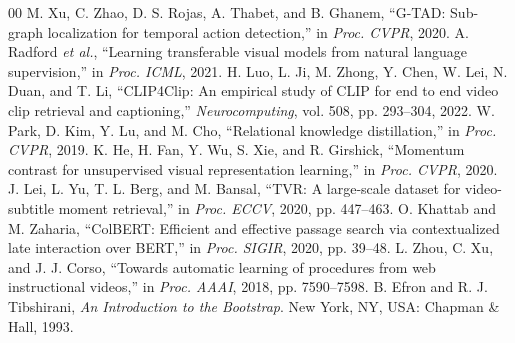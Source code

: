 \documentclass{IEEEtran}
\begin{document}
\begin{thebibliography}{00}
 M. Xu, C. Zhao, D. S. Rojas, A. Thabet, and B. Ghanem, ``G-TAD: Sub-graph localization for temporal action detection,'' in \textit{Proc. CVPR}, 2020.
 A. Radford \textit{et al.}, ``Learning transferable visual models from natural language supervision,'' in \textit{Proc. ICML}, 2021.
 H. Luo, L. Ji, M. Zhong, Y. Chen, W. Lei, N. Duan, and T. Li, ``CLIP4Clip: An empirical study of CLIP for end to end video clip retrieval and captioning,'' \textit{Neurocomputing}, vol. 508, pp. 293--304, 2022.
 W. Park, D. Kim, Y. Lu, and M. Cho, ``Relational knowledge distillation,'' in \textit{Proc. CVPR}, 2019.
 K. He, H. Fan, Y. Wu, S. Xie, and R. Girshick, ``Momentum contrast for unsupervised visual representation learning,'' in \textit{Proc. CVPR}, 2020.
 J. Lei, L. Yu, T. L. Berg, and M. Bansal, ``TVR: A large-scale dataset for video-subtitle moment retrieval,'' in \textit{Proc. ECCV}, 2020, pp. 447--463.
 O. Khattab and M. Zaharia, ``ColBERT: Efficient and effective passage search via contextualized late interaction over BERT,'' in \textit{Proc. SIGIR}, 2020, pp. 39--48.
 L. Zhou, C. Xu, and J. J. Corso, ``Towards automatic learning of procedures from web instructional videos,'' in \textit{Proc. AAAI}, 2018, pp. 7590--7598.
 B. Efron and R. J. Tibshirani, \textit{An Introduction to the Bootstrap}. New York, NY, USA: Chapman \& Hall, 1993.
\end{thebibliography}
\end{document}
